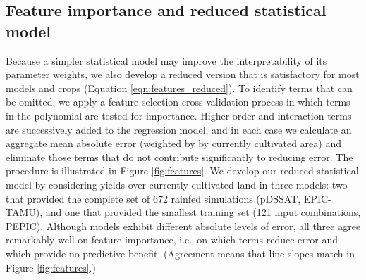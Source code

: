 \documentclass[gmd, manuscript]{copernicus} %
\begin{document}
\subsection{Feature importance and reduced statistical model}
\label{sec:features}

Because a simpler statistical model may improve the interpretability of its parameter weights, we also develop a reduced version that is satisfactory for most models and crops (Equation \ref{eqn:features_reduced}).
To identify terms that can be omitted, we apply a feature selection cross-validation process in which terms in the polynomial are tested for importance. Higher-order and interaction terms are successively added to the regression model, and in each case we calculate an aggregate mean absolute error (weighted by by currently cultivated area) and eliminate those terms that do not contribute significantly to reducing error. The procedure is illustrated in Figure \ref{fig:features}. We develop our reduced statistical model by considering yields over currently cultivated land in three models: two that provided the complete set of 672 rainfed simulations (pDSSAT, EPIC-TAMU), and one that provided the smallest training set (121 input combinations, PEPIC).
Although models exhibit different absolute levels of error, all three agree remarkably well on feature importance, i.e.\ on which terms reduce error and which provide no predictive benefit. (Agreement means that line slopes match in Figure \ref{fig:features}.) 
 
\end{document}
